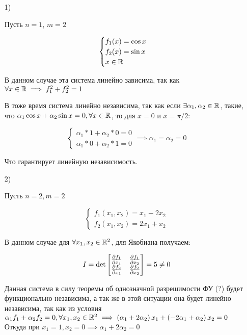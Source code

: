 \documentclass[../../main.tex]{subfiles}
\begin{document}
\begin{examples}
	\begin{itemize}
		\;
		\item[1)]
		
		Пусть $n = 1$, $m = 2$
		
		\[ \begin{cases}
		f_1(x) = \cos x \\
		f_2(x) = \sin x \\
		x \in \mathbb{R}
		\end{cases}  \]
		
		В данном случае эта система линейно зависима, так как 
		$\forall x \in \mathbb{R} \implies f_1^2 + f_2^2 = 1 $
		
		В тоже время система линейно независима, так как если 
		$\exists \alpha_1, \alpha_2 \in \mathbb{R} $, такие, что
		$\alpha_1 \cos x + \alpha_2 \sin x = 0, \forall x \in 
		\mathbb{R}$, то для $x = 0 \textrm{ и } x = \pi / 2$:
		
		\[\begin{cases}
		\alpha_1 * 1 + \alpha_2 * 0 = 0 \\
		\alpha_1 * 0 + \alpha_2 * 1 = 0 
		\end{cases} \implies \alpha_1 = \alpha_2 = 0 \] 
		
		Что гарантирует линейную независимость.
		
		\item[2)] 
		
		Пусть $n = 2, m = 2$	
		
		\[ \begin{cases}
		f_1 \left( x_1, x_2 \right) = x_1 - 2x_2 \\
		f_2 \left( x_1, x_2 \right) = 2x_1 + x_2
		\end{cases} \]
		
		В данном случае для $\forall x_1, x_2 \in \mathbb{R}^2$, для Якобиана получаем:
		
		\[ I = \det \begin{bmatrix}
		\frac{\partial f_1}{\partial x_1} & \frac{\partial f_1}{\partial x_2} \\
		
		\frac{\partial f_2}{\partial x_1} & \frac{\partial f_2}{\partial x_2}
		\end{bmatrix} = 5 \ne 0 \]
		
		Данная система в силу теоремы об однозначной разрешимости ФУ (?) 
		будет функционально независима,
		а так же в этой ситуации она будет линейно независима, 
		так как из условия $\alpha_1 f_1 + \alpha_2 f_2 = 0, 
		\forall x_1, x_2 \in \mathbb{R}^2 \implies \left(\alpha_1 + 
		2\alpha_2\right) x_1 + \left( -2\alpha_1 + \alpha_2 
		\right) x_2 = 0$
		Откуда при $x_1 = 1, x_2 = 0 \implies \alpha_1 + 2\alpha_2 = 0$
		

\end{itemize}
\end{examples}
\end{document}
